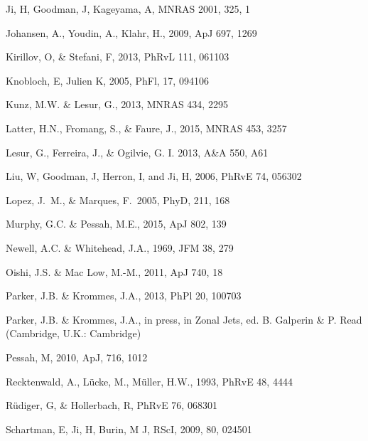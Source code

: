 \documentclass{emulateapj}
\begin{document}
\begin{thebibliography}{53}
Ji, H, Goodman, J, Kageyama, A, MNRAS 2001, 325, 1

Johansen, A., Youdin, A., Klahr, H., 2009, ApJ 697, 1269

Kirillov, O, \& Stefani, F, 2013, PhRvL 111, 061103

Knobloch, E, Julien K, 2005, PhFl, 17, 094106

Kunz, M.W. \& Lesur, G., 2013, MNRAS 434, 2295

Latter, H.N., Fromang, S., \& Faure, J., 2015, MNRAS 453, 3257

Lesur, G., Ferreira, J., \& Ogilvie, G. I. 2013, A\&A 550, A61

Liu, W, Goodman, J, Herron, I, and Ji, H, 2006, PhRvE 74, 056302

Lopez, J.~M., \& Marques, F.\ 2005, PhyD, 211, 168

Murphy, G.C. \& Pessah, M.E., 2015, ApJ 802, 139

Newell, A.C. \& Whitehead, J.A., 1969, JFM 38, 279

Oishi, J.S. \& Mac Low, M.-M., 2011, ApJ 740, 18

Parker, J.B. \& Krommes, J.A., 2013, PhPl 20, 100703

Parker, J.B. \& Krommes, J.A., in press, in Zonal Jets, ed. B. Galperin \& P. Read (Cambridge, U.K.: Cambridge)

Pessah, M, 2010, ApJ, 716, 1012

Recktenwald, A., L\"ucke, M., M\"uller, H.W., 1993, PhRvE 48, 4444

R\"udiger, G, \& Hollerbach, R, PhRvE 76, 068301

Schartman, E, Ji, H, Burin, M J, RScI, 2009, 80, 024501


\end{thebibliography}
\end{document}
